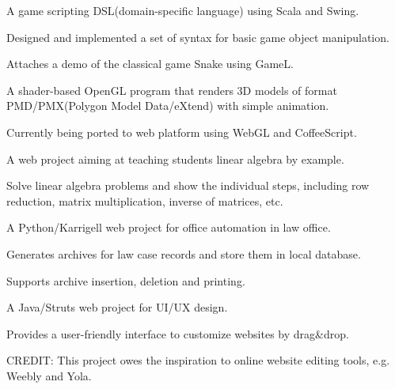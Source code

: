 \documentclass[]{deedy-resume-openfont}
\begin{document}
\begin{minipage}[t]{0.66\textwidth}
\begin{tightemize} 
\item A game scripting DSL(domain-specific language) using Scala and Swing.
\item Designed and implemented a set of syntax for basic game object manipulation.
\item Attaches a demo of the classical game Snake using GameL.
\end{tightemize}
\sectionsep

\begin{tightemize} 
\item A shader-based OpenGL program that renders 3D models of format PMD/PMX(Polygon Model Data/eXtend) with simple animation. 
\item Currently being ported to web platform using WebGL and CoffeeScript.
\end{tightemize}
\sectionsep

\begin{tightemize} 
\item A web project aiming at teaching students linear algebra by example.
\item Solve linear algebra problems and show the individual steps,
    including row reduction, matrix multiplication, inverse of matrices, etc.
\end{tightemize}
\sectionsep

\begin{tightemize} 
\item A Python/Karrigell web project for office automation in law office.
\item Generates archives for law case records and store them in local database.
\item Supports archive insertion, deletion and printing.
\end{tightemize}
\sectionsep

\begin{tightemize} 
\item A Java/Struts web project for UI/UX design.
\item Provides a user-friendly interface to customize websites by drag\&drop.
\item CREDIT: This project owes the inspiration to online website editing tools, e.g. Weebly and Yola. 
\end{tightemize}
\sectionsep

\end{minipage} 
\end{document}
